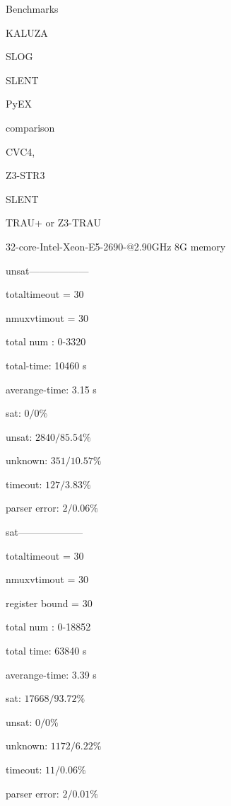 
Benchmarks


KALUZA

SLOG

SLENT

PyEX \cite{ReynoldsWBBLT17}

comparison

CVC4,

Z3-STR3

SLENT

TRAU+ or Z3-TRAU

32-core-Intel-Xeon-E5-2690-@2.90GHz
8G memory

unsat------------------

totaltimeout = 30

nmuxvtimout = 30

total num : 0-3320

total-time: 10460 s

averange-time: 3.15 s 

sat: $0 / 0\%$

unsat: $2840 / 85.54\%$

unknown: $351 / 10.57\%$

timeout: $127 / 3.83\%$

parser error: $2 / 0.06\%$

sat--------------------

totaltimeout = 30

nmuxvtimout = 30

register bound = 30

total num : 0-18852

total time: 63840 s

averange-time: 3.39 s 

sat: $17668 / 93.72\%$

unsat: $0 / 0\%$


unknown: $1172 / 6.22\%$

timeout: $11 / 0.06\%$

parser error: $2 / 0.01\%$